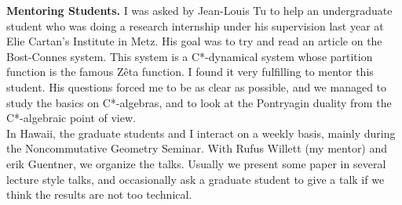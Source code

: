 \documentclass[a4paper]{article}
\begin{document}
\textbf{Mentoring Students.} I was asked by Jean-Louis Tu to help an undergraduate student who was doing a research internship under his supervision last year at Elie Cartan’s Institute in Metz. His goal was to try and read an article on the Bost-Connes system. This system is a C*-dynamical system whose partition function is the famous Zêta function. I found it very fulfilling to mentor this student. His questions forced me to be as clear as possible, and we managed to study the basics on C*-algebras, and to look at the Pontryagin duality from the C*-algebraic point of view. \\

In Hawaii, the graduate students and I interact on a weekly basis, mainly during the Noncommutative Geometry Seminar. With Rufus Willett (my mentor) and erik Guentner, we organize the talks. Usually we present some paper in several lecture style talks, and occasionally ask a graduate student to give a talk if we think the results are not too technical.\\


 
\end{document}
